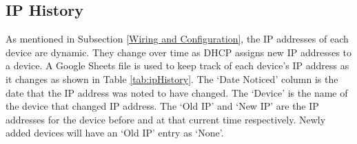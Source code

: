 \begin{table}[H]
    \centering
    \caption{Device inventory excerpt. Password column not shown.}
    \label{tab:deviceInventory}
\end{table}

\subsection{IP History}
\label{IP History}
As mentioned in Subsection \ref{Wiring and Configuration}, the IP addresses of each device are dynamic. They change over time as DHCP assigns new IP addresses to a device. A Google Sheets file is used to keep track of each device's IP address as it changes as shown in Table \ref{tab:ipHistory}. The `Date Noticed' column is the date that the IP address was noted to have changed. The `Device' is the name of the device that changed IP address. The `Old IP' and `New IP' are the IP addresses for the device before and at that current time respectively. Newly added devices will have an `Old IP' entry as `None'.

